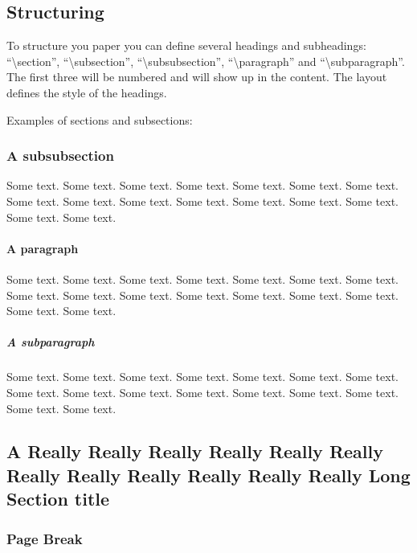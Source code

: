 \subsection{Structuring}

To structure you paper you can define several headings and
subheadings:
``\textbackslash{}section'', ``\textbackslash{}subsection'',
``\textbackslash{}subsubsection'', ``\textbackslash{}paragraph'' and
``\textbackslash{}subparagraph''. The first three will be numbered and
will show
up in the content. The layout defines the style of the headings.

Examples of sections and subsections:

\subsubsection{A subsubsection}

Some text. Some text. Some text. Some text. Some text. Some text. Some
text. Some text. Some text. Some text. Some text. Some text. Some
text. Some text. Some text. Some text.

\paragraph{A paragraph}

Some text. Some text. Some text. Some text. Some text. Some text. Some
text. Some text. Some text. Some text. Some text. Some text. Some
text. Some text. Some text. Some text.

\subparagraph{A subparagraph}

Some text. Some text. Some text. Some text. Some text. Some text. Some
text. Some text. Some text. Some text. Some text. Some text. Some
text. Some text. Some text. Some text.

\subsection{A Really Really Really Really Really Really Really Really Really Really Really Really Long Section title}
\subsubsection{Page Break}


